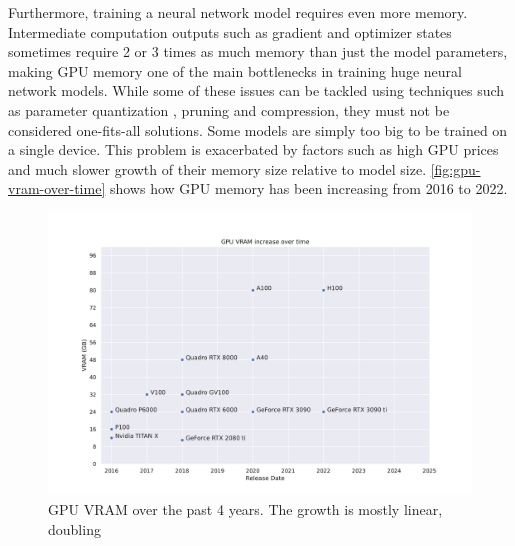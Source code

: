 Furthermore, training a neural network model requires even more memory.
Intermediate computation outputs such as gradient and optimizer states sometimes require 2 or 3 times as much memory than just the model parameters, making GPU memory one of the main bottlenecks in training huge neural network models.
While some of these issues can be tackled using techniques such as parameter quantization \cite{DBLP:journals/corr/abs-2003-11316}, pruning and compression, they must not be considered one-fits-all solutions.
Some models are simply too big to be trained on a single device.
This problem is exacerbated by factors such as high GPU prices and much slower growth of their memory size relative to model size.
\autoref{fig:gpu-vram-over-time} shows how GPU memory has been increasing from 2016 to 2022.

\begin{figure}[h]
    \caption{GPU VRAM over the past 4 years. The growth is mostly linear, doubling }
    \label{fig:gpu-vram-over-time}
    \includegraphics[width=\textwidth]{./figures/gpu-vram-over-time.pdf}
\end{figure}

